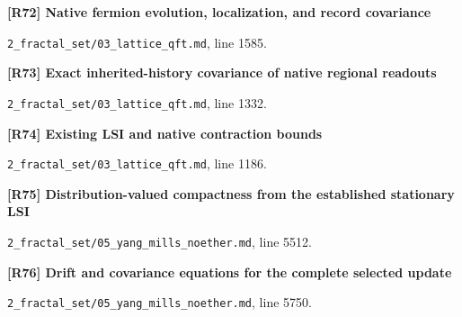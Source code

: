 \documentclass[11pt,a4paper]{article}
\begin{document}
\par\medskip\noindent\begin{minipage}{\linewidth}\textbf{[R72] Native fermion evolution, localization, and record covariance}\label{src:thm-lqft-native-local-fermion-evolution}\par
{\small\texttt{}\par
\nolinkurl{2_fractal_set/03_lattice_qft.md}, line 1585.\par}
\end{minipage}\par

\par\medskip\noindent\begin{minipage}{\linewidth}\textbf{[R73] Exact inherited-history covariance of native regional readouts}\label{src:thm-lqft-inherited-history-covariance}\par
{\small\texttt{}\par
\nolinkurl{2_fractal_set/03_lattice_qft.md}, line 1332.\par}
\end{minipage}\par

\par\medskip\noindent\begin{minipage}{\linewidth}\textbf{[R74] Existing LSI and native contraction bounds}\label{src:cor-lqft-fock-lsi-transfer}\par
{\small\texttt{}\par
\nolinkurl{2_fractal_set/03_lattice_qft.md}, line 1186.\par}
\end{minipage}\par

\par\medskip\noindent\begin{minipage}{\linewidth}\textbf{[R75] Distribution-valued compactness from the established stationary LSI}\label{src:thm-ym-spacetime-fluctuation-compactness}\par
{\small\texttt{}\par
\nolinkurl{2_fractal_set/05_yang_mills_noether.md}, line 5512.\par}
\end{minipage}\par

\par\medskip\noindent\begin{minipage}{\linewidth}\textbf{[R76] Drift and covariance equations for the complete selected update}\label{src:prop-ym-complete-fluctuation-equations}\par
{\small\texttt{}\par
\nolinkurl{2_fractal_set/05_yang_mills_noether.md}, line 5750.\par}
\end{minipage}\par
\end{document}
